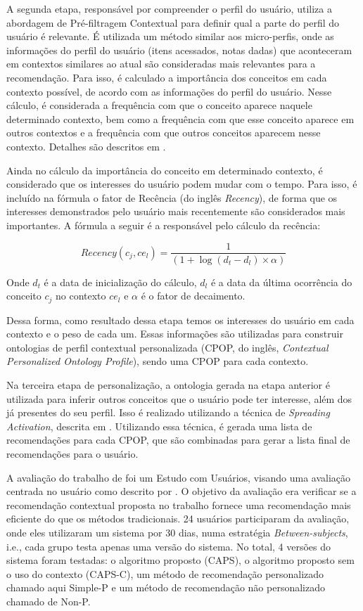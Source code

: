A segunda etapa, responsável por compreender o perfil do usuário, utiliza a abordagem de Pré-filtragem Contextual para
definir qual a parte do perfil do usuário é relevante. É utilizada um método similar aos micro-perfis, onde as
informações do perfil do usuário (itens acessados, notas dadas) que aconteceram em contextos similares ao atual são
consideradas mais relevantes para a recomendação. Para isso, é calculado a importância dos conceitos em cada contexto
possível, de acordo com as informações do perfil do usuário. Nesse cálculo, é considerada a frequência com que o
conceito aparece naquele determinado contexto, bem como a frequência com que esse conceito aparece em outros contextos
e a frequência com que outros conceitos aparecem nesse contexto. Detalhes são descritos em \cite{hawalah2014utilizing}.

Ainda no cálculo da importância do conceito em determinado contexto, é considerado que os interesses do usuário podem
mudar com o tempo. Para isso, é incluído na fórmula o fator de Recência (do inglês \textit{Recency}), de forma que os interesses
demonstrados pelo usuário mais recentemente são considerados mais importantes. A fórmula a seguir é a responsável pelo
cálculo da recência:

\begin{equation}
  Recency(c_j, ce_l) = \frac{1}{(1+\log(d_t - d_l) \times \alpha)}
  \label{eq:hawalah-recencia}
\end{equation}

Onde $d_t$ é a data de inicialização do cálculo, $d_l$ é a data da última ocorrência do conceito $c_j$ no contexto
$ce_l$ e $\alpha$ é o fator de decaimento.

Dessa forma, como resultado dessa etapa temos os interesses do usuário em cada contexto e o peso de cada um. Essas
informações são utilizadas para construir ontologias de perfil contextual personalizada (CPOP, do inglês, \textit{Contextual
Personalized Ontology Profile}), sendo uma CPOP para cada contexto.

Na terceira etapa de personalização, a ontologia gerada na etapa anterior é utilizada para inferir outros conceitos que
o usuário pode ter interesse, além dos já presentes do seu perfil. Isso é realizado utilizando a técnica de \textit{Spreading
Activation}, descrita em . Utilizando essa técnica, é gerada uma lista de recomendações
para cada CPOP, que são combinadas para gerar a lista final de recomendações para o usuário.

A avaliação do trabalho de  foi um Estudo com Usuários, visando uma avaliação centrada
no usuário como descrito por . O objetivo da avaliação era verificar se a recomendação
contextual proposta no trabalho fornece uma recomendação mais eficiente do que os métodos tradicionais. 24 usuários
participaram da avaliação, onde eles utilizaram um sistema por 30 dias, numa estratégia \textit{Between-subjects}, i.e., cada
grupo testa apenas uma versão do sistema. No total, 4 versões do sistema foram testadas: o algoritmo proposto (CAPS), o
algoritmo proposto sem o uso do contexto (CAPS-C), um método de recomendação personalizado chamado aqui Simple-P e um
método de recomendação não personalizado chamado de Non-P.

